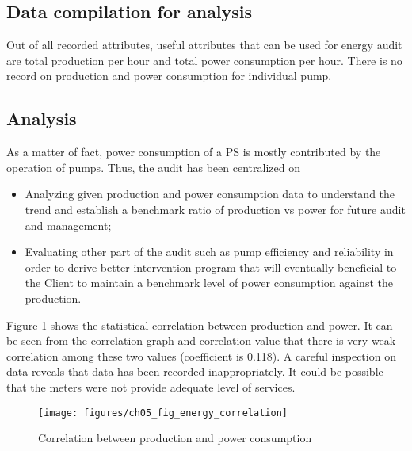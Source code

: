 \subsection{Data compilation for analysis}
Out of all recorded attributes, useful attributes that can be used for energy audit are total production per hour and total power consumption per hour. There is no record on production and power consumption for individual pump.


\subsection{Analysis}

As a matter of fact, power consumption of a PS is mostly contributed by the operation of pumps. Thus, the audit has been centralized on 
\begin{itemize}
	\item Analyzing given production and power consumption data to understand the trend and establish a benchmark ratio of production vs power for future audit and management;
	\item Evaluating other part of the audit such as pump efficiency and reliability in order to derive better intervention program that will eventually beneficial to the Client to maintain a benchmark level of power consumption against the production. 
\end{itemize}

Figure \ref{ch05_fig_energy_correlation} shows the statistical correlation between production and power. It can be seen from the correlation graph and correlation value that there is very weak correlation among these two values (coefficient is 0.118). A careful inspection on data reveals that data has been recorded inappropriately. It could be possible that the meters were not provide adequate level of services.


\begin{figure}[!htb]
	\texttt{[image: figures/ch05\_fig\_energy\_correlation]} \\
	\caption{Correlation between production and power consumption}
	\label{ch05_fig_energy_correlation} 
\end{figure}


